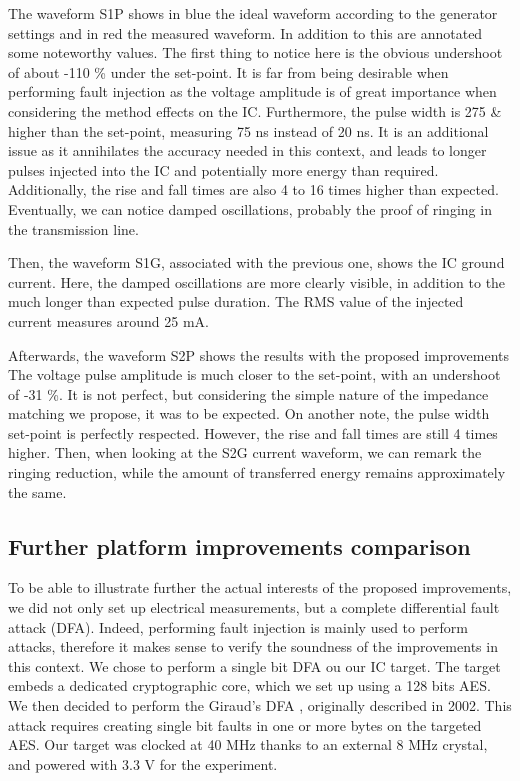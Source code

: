 		The waveform S1P shows in blue the ideal waveform according to the generator settings and in red the measured waveform.
		In addition to this are annotated some noteworthy values.
		The first thing to notice here is the obvious undershoot of about -110 \% under the set-point.
		It is far from being desirable when performing fault injection as the voltage amplitude is of great importance when considering the method effects on the IC.
		Furthermore, the pulse width is 275 \& higher than the set-point, measuring 75 ns instead of 20 ns.
		It is an additional issue as it annihilates the accuracy needed in this context, and leads to longer pulses injected into the IC and potentially more energy than required.
		Additionally, the rise and fall times are also 4 to 16 times higher than expected.
		Eventually, we can notice damped oscillations, probably the proof of ringing in the transmission line.
		
		Then, the waveform S1G, associated with the previous one, shows the IC ground current.
		Here, the damped oscillations are more clearly visible, in addition to the much longer than expected pulse duration.
		The RMS value of the injected current measures around 25 mA.
		
		Afterwards, the waveform S2P shows the results with the proposed improvements
		The voltage pulse amplitude is much closer to the set-point, with an undershoot of -31 \%.
		It is not perfect, but considering the simple nature of the impedance matching we propose, it was to be expected.
		On another note, the pulse width set-point is perfectly respected.
		However, the rise and fall times are still 4 times higher.
		Then, when looking at the S2G current waveform, we can remark the ringing reduction, while the amount of transferred energy remains approximately the same.
		
	\subsection{Further platform improvements comparison}
		To be able to illustrate further the actual interests of the proposed improvements, we did not only set up electrical measurements, but a complete differential fault attack (DFA).
		Indeed, performing fault injection is mainly used to perform attacks, therefore it makes sense to verify the soundness of the improvements in this context.
		We chose to perform a single bit DFA ou our IC target.
		The target embeds a dedicated cryptographic core, which we set up using a 128 bits AES.
		We then decided to perform the Giraud's DFA \cite{giraudDfa}, originally described in 2002.
		This attack requires creating single bit faults in one or more bytes on the targeted AES.
		Our target was clocked at 40 MHz thanks to an external 8 MHz crystal, and powered with 3.3 V for the experiment.
		
